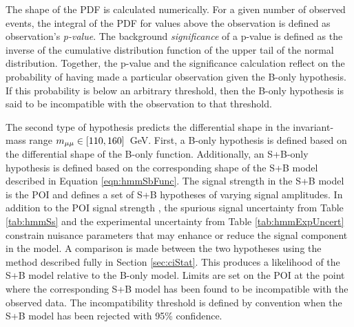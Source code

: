 The shape of the PDF is calculated numerically.
For a given number of observed events, the integral of the PDF for values above the observation is defined as observation's \emph{p-value}.
The background \emph{significance} of a p-value is defined as the inverse of the cumulative distribution function of the upper tail of the normal distribution.
Together, the p-value and the significance calculation reflect on the probability of having made a particular observation given the B-only hypothesis.
If this probability is below an arbitrary threshold, then the B-only hypothesis is said to be incompatible with the observation to that threshold.

The second type of hypothesis predicts the differential \muu shape in the invariant-mass range $m_{\mu\mu}\in[110,160]$~GeV.
First, a B-only hypothesis is defined based on the differential shape of the B-only function.
Additionally, an S+B-only hypothesis is defined based on the corresponding shape of the S+B model described in Equation \ref{eqn:hmmSbFunc}.
The signal strength \mus in the S+B model is the POI and defines a set of S+B hypotheses of varying signal amplitudes.
In addition to the POI signal strength \mus, the spurious signal uncertainty from Table \ref{tab:hmmSs} and the experimental uncertainty from Table \ref{tab:hmmExpUncert} constrain nuisance parameters that may enhance or reduce the signal component in the model.
A comparison is made between the two hypotheses using the \cls method described fully in Section \ref{sec:ciStat}.
This produces a likelihood of the S+B model relative to the B-only model.
Limits are set on the POI at the point where the corresponding S+B model has been found to be incompatible with the observed data.
The incompatibility threshold is defined by convention when the S+B model has been rejected with 95\% confidence.  

